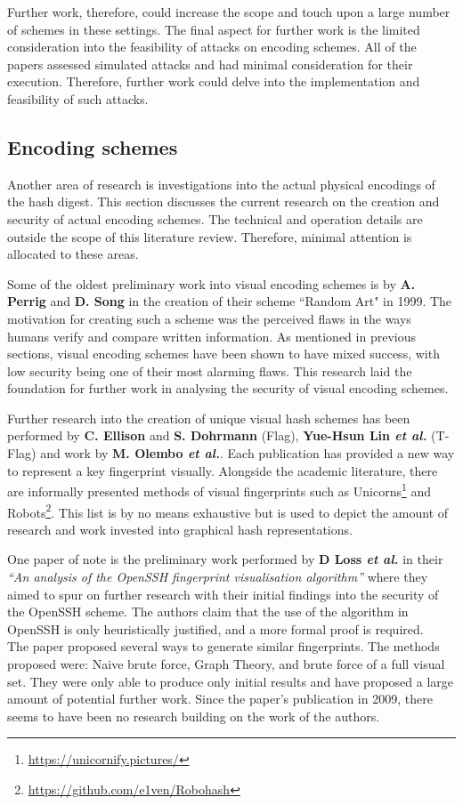Further work, therefore, could increase the scope and touch upon a large number of schemes in these settings. The final aspect for further work is the limited consideration into the feasibility of attacks on encoding schemes. All of the papers assessed simulated attacks and had minimal consideration for their execution. Therefore, further work could delve
into the implementation and feasibility of such attacks.

\subsection{Encoding schemes}
Another area of research is investigations into the actual physical encodings of the hash digest. This section discusses the current research on the creation and security of actual encoding schemes. The technical and operation details are outside the scope of this literature review. Therefore, minimal attention is allocated to these areas.

Some of the oldest preliminary work into visual encoding schemes is by \textbf{A. Perrig} and \textbf{D. Song}\cite{perrig1999hash} in the creation of their scheme ``Random Art" in 1999. The motivation for creating such a scheme was the perceived flaws in the ways humans verify and compare written information. As mentioned in previous sections, visual encoding schemes have been shown to have mixed success, with low security being one of their most alarming flaws. This research laid the foundation for further work in analysing the security of visual encoding schemes.

Further research into the creation of unique visual hash schemes has been performed by \textbf{C. Ellison} and \textbf{S. Dohrmann}\cite{ellison2003public} (Flag), \textbf{Yue-Hsun Lin \textit{et al.}}\cite{lin2010spate} (T-Flag) and work by \textbf{M.  Olembo \textit{et al.}}\cite{olembo2013developing}. Each publication has provided a new way  to represent a key fingerprint visually. Alongside the academic literature, there are informally presented methods of visual fingerprints such as Unicorns\footnote{\url{https://unicornify.pictures/}} and Robots\footnote{\url{https://github.com/e1ven/Robohash}}. This list is by no means exhaustive but is used to depict the amount of research and work invested into graphical hash representations.

One paper of note is the preliminary work performed by \textbf{D Loss \textit{et al.}}\cite{loss2009drunken} in their \textit{``An analysis of the OpenSSH fingerprint visualisation algorithm''} where  they aimed to spur on further research with their initial findings into the security of the OpenSSH scheme. The authors claim that the use of the algorithm in OpenSSH is only heuristically justified, and a more formal proof is required.\\
The paper proposed several ways to generate similar fingerprints. The methods proposed were: Naive brute force, Graph Theory, and brute force of a full visual set. They were only able to produce only initial results and have proposed a large amount of potential further work. Since the paper's publication in 2009, there seems to have been no research building on the work of the authors.

